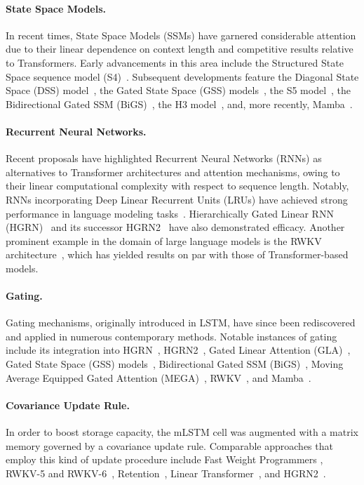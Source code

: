 \paragraph{State Space Models.} In recent times, State Space Models (SSMs) have garnered considerable attention due to their linear dependence on context length and competitive results relative to Transformers. Early advancements in this area include the Structured State Space sequence model (S4)~\citep{Gu:21}. Subsequent developments feature the Diagonal State Space (DSS) model~\citep{Gupta:22}, the Gated State Space (GSS) models~\citep{Mehta:22}, the S5 model~\citep{Smith:22}, the Bidirectional Gated SSM (BiGS)~\citep{Wang:22}, the H3 model~\citep{Fu:23}, and, more recently, Mamba~\citep{Gu:24arxiv}.

\paragraph{Recurrent Neural Networks.} Recent proposals have highlighted Recurrent Neural Networks (RNNs) as alternatives to Transformer architectures and attention mechanisms, owing to their linear computational complexity with respect to sequence length. Notably, RNNs incorporating Deep Linear Recurrent Units (LRUs) have achieved strong performance in language modeling tasks~\citep{Orvieto:23, De:24arxiv}. Hierarchically Gated Linear RNN (HGRN)~\citep{Qin:23} and its successor HGRN2~\citep{Qin:24arxiv} have also demonstrated efficacy. Another prominent example in the domain of large language models is the RWKV architecture~\citep{Peng:23arxivshort,Peng:24arxivshort}, which has yielded results on par with those of Transformer-based models.

\paragraph{Gating.}
Gating mechanisms, originally introduced in LSTM, have since been rediscovered and applied in numerous contemporary methods. Notable instances of gating include its integration into HGRN~\citep{Qin:23}, HGRN2~\citep{Qin:24arxiv}, Gated Linear Attention (GLA)~\citep{Yang:23arxiv}, Gated State Space (GSS) models~\citep{Mehta:22}, Bidirectional Gated SSM (BiGS)~\citep{Wang:22}, Moving Average Equipped Gated Attention (MEGA)~\citep{Ma:22}, RWKV~\citep{Peng:23arxivshort}, and Mamba~\citep{Gu:24arxiv}.

\paragraph{Covariance Update Rule.} In order to boost storage capacity, the mLSTM cell was augmented with a matrix memory governed by a covariance update rule. Comparable approaches that employ this kind of update procedure include Fast Weight Programmers \citep{Schmidhuber:92ncfastweights,Schlag:21}, RWKV-5 and RWKV-6~\citep{Peng:24arxivshort}, Retention~\citep{Sun:23arxiv}, Linear Transformer~\citep{Katharopoulos:20}, and HGRN2~\citep{Qin:24arxiv}.

